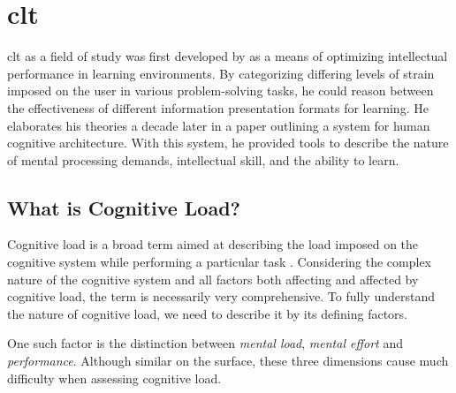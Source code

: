 \section{\acrlong{clt}} \label{sec:bt/CLT}

\acrfull{clt} as a field of study was first developed by \textcite{sweller1988} as a means of optimizing intellectual performance in learning environments. By categorizing differing levels of strain imposed on the user in various problem-solving tasks, he could reason between the effectiveness of different information presentation formats for learning. He elaborates his theories a decade later in a paper outlining a system for human cognitive architecture. With this system, he provided tools to describe the nature of mental processing demands, intellectual skill, and the ability to learn.



\subsection{What is Cognitive Load?} \label{sec:bt/CLT/what}


Cognitive load is a broad term aimed at describing the load imposed on the cognitive system while performing a particular task \cite{paas1994A}. Considering the complex nature of the cognitive system and all factors both affecting and affected by cognitive load, the term is necessarily very comprehensive. To fully understand the nature of cognitive load, we need to describe it by its defining factors. 

One such factor is the distinction between \textit{mental load}, \textit{mental effort} and \textit{performance}. Although similar on the surface, these three dimensions cause much difficulty when assessing cognitive load.

